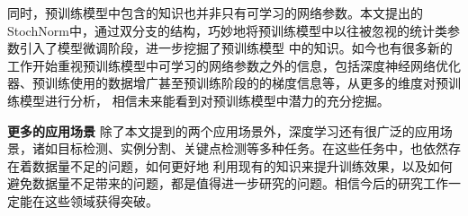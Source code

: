 同时，预训练模型中包含的知识也并非只有可学习的网络参数。本文提出的StochNorm中，通过双分支的结构，巧妙地将预训练模型中以往被忽视的统计类参数引入了模型微调阶段，进一步挖掘了预训练模型
中的知识。如今也有很多新的工作开始重视预训练模型中可学习的网络参数之外的信息，包括深度神经网络优化器、预训练使用的数据增广甚至预训练阶段的的梯度信息等，从更多的维度对预训练模型进行分析，
相信未来能看到对预训练模型中潜力的充分挖掘。


\textbf{更多的应用场景 } 除了本文提到的两个应用场景外，深度学习还有很广泛的应用场景，诸如目标检测、实例分割、关键点检测等多种任务。在这些任务中，也依然存在着数据量不足的问题，如何更好地
利用现有的知识来提升训练效果，以及如何避免数据量不足带来的问题，都是值得进一步研究的问题。相信今后的研究工作一定能在这些领域获得突破。
